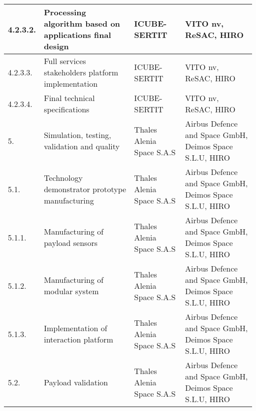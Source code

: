 \begin{longtable}[H]{p{1.5cm} >{\raggedright\arraybackslash}p{4cm} >{\raggedright\arraybackslash}p{3.8cm} >{\raggedright\arraybackslash}p{4cm}}
	\midrule
	
	4.2.3.2. & Processing algorithm based on applications final design & ICUBE-SERTIT & VITO nv, ReSAC, HIRO\vspace{0.2cm} \\
	
	\midrule
	
	4.2.3.3. & Full services stakeholders platform implementation& ICUBE-SERTIT & VITO nv, ReSAC, HIRO\vspace{0.2cm} \\
	
	\midrule
	
	4.2.3.4. & Final technical specifications & ICUBE-SERTIT & VITO nv, ReSAC, HIRO\vspace{0.2cm} \\
	
	\midrule
	
	5. & Simulation, testing, validation and quality & Thales Alenia Space S.A.S & Airbus Defence and Space GmbH, Deimos Space S.L.U, HIRO\vspace{0.2cm} \\
	
	\midrule
	
	5.1. & Technology demonstrator prototype manufacturing &Thales Alenia Space S.A.S & Airbus Defence and Space GmbH, Deimos Space S.L.U, HIRO\vspace{0.2cm} \\
	
	\midrule
	
	5.1.1. & Manufacturing of payload sensors & Thales Alenia Space S.A.S & Airbus Defence and Space GmbH, Deimos Space S.L.U, HIRO\vspace{0.2cm} \\
	
	\midrule
	
	5.1.2. & Manufacturing of modular system & Thales Alenia Space S.A.S & Airbus Defence and Space GmbH, Deimos Space S.L.U, HIRO\vspace{0.2cm} \\
	
	\midrule
	
	5.1.3. & Implementation of interaction platform & Thales Alenia Space S.A.S & Airbus Defence and Space GmbH, Deimos Space S.L.U, HIRO\vspace{0.2cm} \\
	
	\midrule
	
	5.2. & Payload validation & Thales Alenia Space S.A.S & Airbus Defence and Space GmbH, Deimos Space S.L.U, HIRO\vspace{0.2cm} \\
	

\end{longtable}
